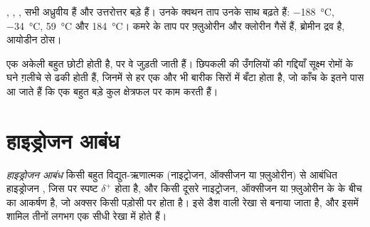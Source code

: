 \begin{example}[हैलोजन]\label{ex:g11:polarity-and-cohesion:halogens}
 , , ,  सभी अध्रुवीय हैं और
उत्तरोत्तर बड़े हैं। उनके क्वथन ताप उनके साथ बढ़ते हैं:
\qty{-188}{\celsius}, \qty{-34}{\celsius}, \qty{59}{\celsius} और
\qty{184}{\celsius}। कमरे के ताप पर फ़्लुओरीन और क्लोरीन
गैसें हैं, ब्रोमीन द्रव है, आयोडीन ठोस।
\end{example}

\begin{remark}[छिपकली]\label{rem:g11:polarity-and-cohesion:gecko}
एक अकेली  बहुत छोटी होती है, पर वे जुड़ती जाती हैं।
छिपकली की उँगलियों की गद्दियाँ सूक्ष्म रोमों के घने ग़लीचे से ढकी होती हैं,
जिनमें से हर एक और भी बारीक सिरों में बँटा होता है, जो काँच के इतने पास आ जाते हैं
कि  एक बहुत बड़े कुल क्षेत्रफल पर काम करती हैं।
\end{remark}

\section{हाइड्रोजन आबंध}

\begin{definition}[हाइड्रोजन आबंध]\label{def:g11:polarity-and-cohesion:hydrogen-bond}
\emph{हाइड्रोजन आबंध} किसी बहुत विद्युत-ऋणात्मक 
(नाइट्रोजन, ऑक्सीजन या फ़्लुओरीन) से आबंधित हाइड्रोजन , जिस पर स्पष्ट
$\delta^+$ होता है, और किसी दूसरे नाइट्रोजन, ऑक्सीजन या फ़्लुओरीन  के  के बीच का आकर्षण है, जो अक्सर किसी पड़ोसी  पर होता है। इसे
डैश वाली रेखा से बनाया जाता है, और इसमें शामिल तीनों  लगभग एक सीधी
रेखा में होते हैं।
\end{definition}

